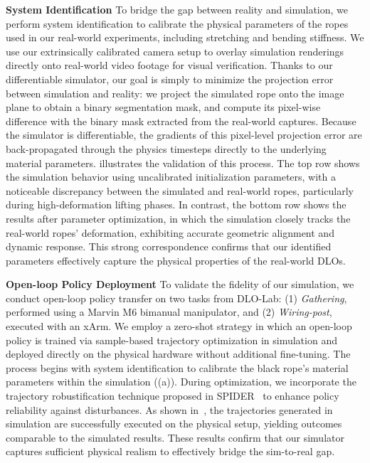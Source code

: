 \textbf{System Identification}
\label{sec:details_system_id}
To bridge the gap between reality and simulation, we perform system identification to calibrate the physical parameters of the ropes used in our real-world experiments, including stretching and bending stiffness.
We use our extrinsically calibrated camera setup to overlay simulation renderings directly onto real-world video footage for visual verification. Thanks to our differentiable simulator, our goal is simply to minimize the projection error between simulation and reality: we project the simulated rope onto the image plane to obtain a binary segmentation mask, and compute its pixel-wise difference with the binary mask extracted from the real-world captures. Because the simulator is differentiable, the gradients of this pixel-level projection error are back-propagated through the physics timesteps directly to the underlying material parameters.  illustrates the validation of this process. The top row shows the simulation behavior using uncalibrated initialization parameters, with a noticeable discrepancy between the simulated and real-world ropes, particularly during high-deformation lifting phases. In contrast, the bottom row shows the results after parameter optimization, in which the simulation closely tracks the real-world ropes' deformation, exhibiting accurate geometric alignment and dynamic response. This strong correspondence confirms that our identified parameters effectively capture the physical properties of the real-world DLOs.


\textbf{Open-loop Policy Deployment}
To validate the fidelity of our simulation, we conduct open-loop policy transfer on two tasks from DLO-Lab: (1) \textit{Gathering}, performed using a Marvin M6 bimanual manipulator, and (2) \textit{Wiring-post}, executed with an xArm. We employ a zero-shot strategy in which an open-loop policy is trained via sample-based trajectory optimization in simulation and deployed directly on the physical hardware without additional fine-tuning. The process begins with system identification to calibrate the black rope's material parameters within the simulation ((a)). During optimization, we incorporate the trajectory robustification technique proposed in SPIDER~\cite{pan2025spider} to enhance policy reliability against disturbances. As shown in~, the trajectories generated in simulation are successfully executed on the physical setup, yielding outcomes comparable to the simulated results. These results confirm that our simulator captures sufficient physical realism to effectively bridge the sim-to-real gap.


